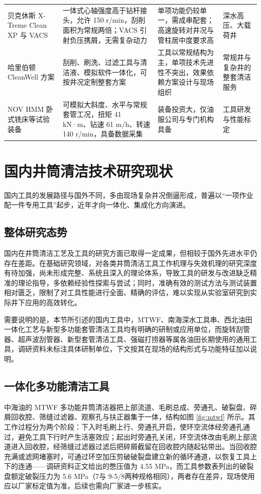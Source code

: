 \begin{table}[H]
\begin{tabularx}{\textwidth}{@{}>{\raggedright\arraybackslash}p{3.2cm}>{\raggedright\arraybackslash}X>{\raggedright\arraybackslash}X>{\raggedright\arraybackslash}p{2.6cm}@{}}
		贝克休斯 X-Treme Clean XP 与 VACS & 一体式心轴强度高于钻杆接头，允许 150 r/min，刮削面积为常规两倍；VACS 引射负压携屑，无需复杂动力 & 单项功能仍较单一，需成串配套；高速旋转对井况与管柱居中度要求高 & 深水高压、大载荷井 \\
		哈里伯顿 CleanWell 方案 & 刮削、刷洗、过滤工具与清洁液、模拟软件一体化，可按井况定制整套方案 & 工具以常规结构为主，单项技术先进性不突出，效果依赖方案设计与现场组织 & 常规井与复杂井的整套清洁服务 \\
		NOV HMM 卧式铣床等试验装备 & 可模拟大斜度、水平与常规套管工况，扭矩 41 kN·m、钻速 61 m/h、转速 140 r/min，具备数据采集 & 装备投资大，仅油服公司与专门机构具备 & 工具研发与性能标定 \\
		\bottomrule
	\end{tabularx}
\end{table}

\section{国内井筒清洁技术研究现状}

国内工具的发展路径与国外不同，多由现场复杂井况倒逼形成，普遍以“一项作业配一件专用工具”起步，近年才向一体化、集成化方向演进。

\subsection{整体研究态势}

国内在井筒清洁工艺及工具的研究方面已取得一定成果，但相较于国外先进水平仍存在差距。在基础研究领域，对各类井筒清洁工具工作机理与失效机理的研究深度有待加强，尚未形成完整、系统且深入的理论体系，导致工具的研发与改进缺乏精准的理论指导，多依赖经验性探索与尝试；同时，准确有效的测试方法与测试装置相对匮乏，限制了对工具性能进行全面、精确的评估，难以实现从实验室研究到实际井下应用的高效转化。

需要说明的是，本节所引述的国内工具中，MTWF、南海深水工具串、西北油田一体化工艺与新型多功能套管清洁工具均有明确的研制或应用单位，而旋转刮管器、超声波刮管器、新型套管清洁工具、强磁打捞器等属各油田长期使用的通用工具，调研资料未标注具体研制单位，下文按其在现场的结构形式与功能特征加以说明。

\subsection{一体化多功能清洁工具}

中海油的 MTWF 多功能井筒清洁器把上部流道、毛刷总成、旁通孔、破裂盘、碎屑回收腔、筛缝过滤器、观察孔与扶正器集于一体，结构如图 \ref{fig:mtwf} 所示。其工作过程分为两个阶段：下入时毛刷上行、旁通孔开启，使环空流体经旁通孔通过，避免工具下行时产生活塞效应；起出时旁通孔关闭，环空流体改由毛刷上部流道进入回收腔，经筛缝过滤器过滤后把碎屑截留在回收腔内随起钻带出。当回收腔充满或滤网堵塞时，可通过环空加压剪破破裂盘建立新的循环通道，以恢复工具上下的连通——调研资料正文给出的憋压值为 4.55 MPa，而工具参数表列出的破裂盘额定破裂压力为 5.6 MPa（7\inch 与 9-5/8\inch 两种规格相同），两者存在差异，现场使用应以厂家标定值为准，后续也需向厂家进一步核实。

